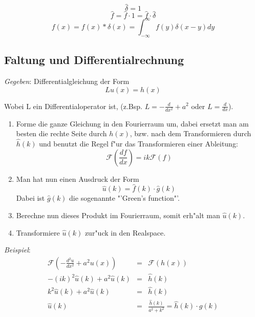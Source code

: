 \documentclass[german, 10pt, a4paper, twocolumn]{scrartcl}
\begin{document}
\begin{displaymath}
	\hat{\delta} = 1
\end{displaymath}
\begin{displaymath}
	\hat{f} = \hat{f}\cdotp 1 = \hat{f}\cdotp\hat{\delta}
\end{displaymath}
\begin{displaymath}
	f(x) = f(x)\ast\delta(x) = \int^{\infty}_{-\infty}f(y)\delta(x-y)dy
\end{displaymath}

\subsection{Faltung und Differentialrechnung}

\textit{Gegeben}: Differentialgleichung der Form
\begin{displaymath}
	L u(x) = h(x)
\end{displaymath}

Wobei L ein Differentialoperator ist, (z.Bsp. $L=-\frac{d}{dx^2}+a^2$ oder $L=\frac{d}{dx}$).\\

\begin{enumerate}
	\item Forme die ganze Gleichung in den Fourierraum um, dabei ersetzt man am besten die rechte Seite durch $h(x)$, bzw. nach dem Transformieren durch $\hat{h}(k)$ und benutzt die Regel f"ur das Transformieren einer Ableitung:
		\begin{displaymath}
			\mathcal{F}\left(\frac{df}{dx} \right) = ik\mathcal{F}(f)
		\end{displaymath}
	\item Man hat nun einen Ausdruck der Form
		\begin{displaymath}
			\hat{u}(k) = \hat{f}(k)\cdotp\hat{g}(k)
		\end{displaymath}
		Dabei ist $\hat{g}(k)$ die sogenannte "'Green's function"'.
	\item Berechne nun dieses Produkt im Fourierraum, somit erh"alt man $\hat{u}(k)$.
	\item Transformiere $\hat{u}(k)$ zur"uck in den Realspace.
\end{enumerate}

\textit{Beispiel}:
\begin{eqnarray}
	\mathcal{F}\left(-\frac{d^2 u}{dx^2}+a^2 u(x) \right ) &= &		\mathcal{F}(h(x))		\nonumber \\
	-(ik)^2\hat{u}(k) + a^2\hat{u}(k) &			= &		\hat{h}(k)	\nonumber \\
	k^2\hat{u}(k) + a^2\hat{u}(k) &				= &		\hat{h}(k)	\nonumber \\
	\hat{u}(k) &						= &		\frac{\hat{h}(k)}{a^2+k^2} = \hat{h}(k)\cdotp \hat{g}(k)	\nonumber
\end{eqnarray}
\end{document}
